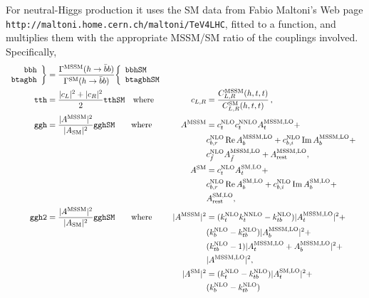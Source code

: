 \documentclass[12pt,a4paper]{report}
\newenvironment{LList}%
  {\left.\begin{array}{r}}%
  {\end{array}\right\}}
\newenvironment{RList}%
  {\left\{\begin{array}{l}}%
  {\end{array}\right.}
\newcommand{\limfunc}[1]{\mathop{\mathrm{#1}}}
\renewcommand{\Re}{\limfunc{Re}}
\renewcommand{\Im}{\limfunc{Im}}
\newcommand{\CODE}[1]{\texttt{#1}}
\begin{document}
For neutral-Higgs production it uses the SM data from Fabio Maltoni's Web
page \CODE{http://maltoni.home.cern.ch/maltoni/TeV4LHC}, fitted to
a function, and multiplies them with the appropriate MSSM/SM ratio of the
couplings involved.  Specifically,
\begin{align*}
\begin{LList}
\CODE{bbh} \\
\CODE{btagbh}
\end{LList}
&= \frac{\Gamma^{\text{MSSM}}(h\to \bar b b)}
        {\Gamma^{\text{SM}}(h\to \bar b b)}
\begin{RList}
\CODE{bbhSM} \\
\CODE{btagbhSM}
\end{RList} \\
%
\CODE{tth} &= \frac{|c_L|^2 + |c_R|^2}{2} \CODE{tthSM}
\quad \text{where} &
c_{L,R} &= \frac{C_{L,R}^{\text{MSSM}}(h,t,t)}
                {C_{L,R}^{\text{SM}}(h,t,t)}\,, \\
%
\CODE{ggh} &= \frac{|A^{\text{MSSM}}|^2}{|A_{\text{SM}}|^2} \CODE{gghSM}
\qquad \text{where} &
A^{\text{MSSM}}
&= c_t^{\text{NLO}} c_t^{\text{NNLO}} A_t^{\text{MSSM,LO}} + \\[-1ex]
&&& c_{b,r}^{\text{NLO}} \Re A_b^{\text{MSSM,LO}} +
    c_{b,i}^{\text{NLO}} \Im A_b^{\text{MSSM,LO}} + \\
&&& c_{\tilde f}^{\text{NLO}} A_{\tilde f}^{\text{MSSM,LO}} +
      A_{\text{rest}}^{\text{MSSM,LO}}, \\
&& A^{\text{SM}} &= c_t^{\text{NLO}} A_t^{\text{SM,LO}} + \\
&&& c_{b,r}^{\text{NLO}} \Re A_b^{\text{SM,LO}} +
    c_{b,i}^{\text{NLO}} \Im A_b^{\text{SM,LO}} + \\
&&& A_{\text{rest}}^{\text{SM,LO}}, \\
%
\CODE{ggh2} &= \frac{|A^{\text{MSSM}}|^2}{|A_{\text{SM}}|^2} \CODE{gghSM}
\qquad \text{where} &
|A^{\text{MSSM}}|^2
&= (k_t^{\text{NLO}} k_t^{\text{NNLO}} - k_{tb}^{\text{NLO}})
      |A_t^{\text{MSSM,LO}}|^2 + \\[-1ex]
&&& (k_b^{\text{NLO}} - k_{tb}^{\text{NLO}})
      |A_b^{\text{MSSM,LO}}|^2 + \\
&&& (k_{tb}^{\text{NLO}} - 1)
      |A_t^{\text{MSSM,LO}} + A_b^{\text{MSSM,LO}}|^2 + \\
&&& |A^{\text{MSSM,LO}}|^2, \\
&& |A^{\text{SM}}|^2
&= (k_t^{\text{NLO}} - k_{tb}^{\text{NLO}})
      |A_t^{\text{SM,LO}}|^2 + \\
&&& (k_b^{\text{NLO}} - k_{tb}^{\text{NLO}})

\end{align*}
\end{document}
